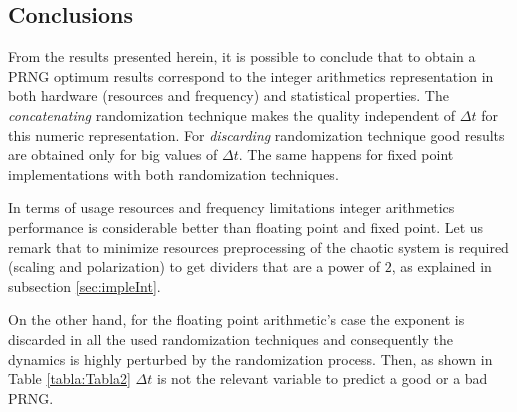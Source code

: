 \subsection{Conclusions}
\label{sec:conclusions} From the results presented herein, it is possible to conclude that to obtain a PRNG optimum results correspond to the integer arithmetics representation in both hardware (resources and frequency) and statistical properties.
The \textit{concatenating} randomization technique makes the quality independent of $\Delta t$ for this numeric representation.
For \textit{discarding} randomization technique good results are obtained  only for big values of $\Delta t$.
The same happens for fixed point implementations with both randomization techniques.

In terms of usage resources and frequency limitations integer arithmetics performance is considerable better than floating point and fixed point.
Let us remark that to minimize resources preprocessing of the chaotic system is required (scaling and polarization) to get dividers that are a power of $2$, as explained in subsection \ref{sec:impleInt}.

On the other hand, for the floating point arithmetic's case the exponent is discarded in all the used randomization techniques and consequently the dynamics is highly perturbed by the randomization process.
Then, as shown in Table \ref{tabla:Tabla2} $\Delta t$ is not the relevant variable to predict a good or a bad PRNG.
